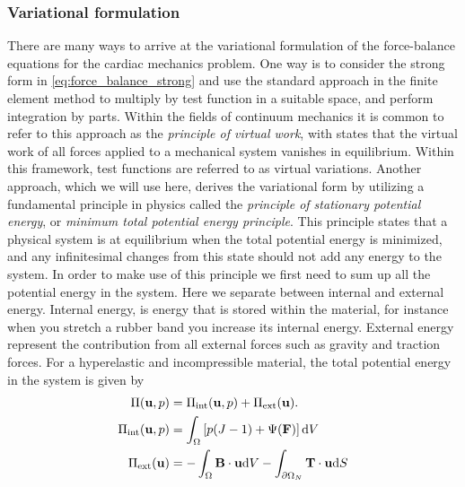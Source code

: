 \subsubsection{Variational formulation}
\label{sec:variational_formulation}
There are many ways to arrive at the variational formulation of the
force-balance equations for the cardiac mechanics problem.  One way is
to consider the strong form in \eqref{eq:force_balance_strong} and use
the standard approach in the finite element method to multiply by
test function in a suitable space, and perform integration by
parts. Within the fields of continuum mechanics it is common to
refer to this approach as the \emph{principle of virtual work}, with states
that the virtual work of all forces applied to a mechanical system
vanishes in equilibrium. Within this framework, test functions are
referred to as virtual variations.
Another approach, which we will use here, derives the variational form
by utilizing a fundamental principle in physics
called the \emph{principle of stationary potential energy}, or
\emph{minimum total potential energy principle}. This principle states that a
physical system is at equilibrium when the total potential energy is
minimized, and any infinitesimal changes from this state should not add
any energy to the system.
In order to make use of this principle we first need to sum up all the
potential energy in the system. Here we separate between internal and
external energy. Internal energy, is energy that is stored within the
material, for instance when you stretch a rubber band you increase its
internal energy. External energy represent the contribution from all
external forces such as gravity and traction forces.
For a hyperelastic and incompressible material, the total potential
energy in the system is given by
\begin{align}
  \Pi(\mathbf{u}, p) &= \Pi_{\mathrm{int}}(\mathbf{u},p) + \Pi_{\mathrm{ext}}(\mathbf{u}). \\
  \Pi_{\mathrm{int}}(\mathbf{u},p) &= \int_{\Omega} \left[ p(J - 1) +  \Psi(\mathbf{F}) \right] \mathrm{d}V\\
  \Pi_{\mathrm{ext}}(\mathbf{u}) &= - \int_{\Omega} \mathbf{B} \cdot \mathbf{u} \mathrm{d} V - \int_{\partial \Omega_N} \mathbf{T} \cdot \mathbf{u} \mathrm{d}S
\end{align}
